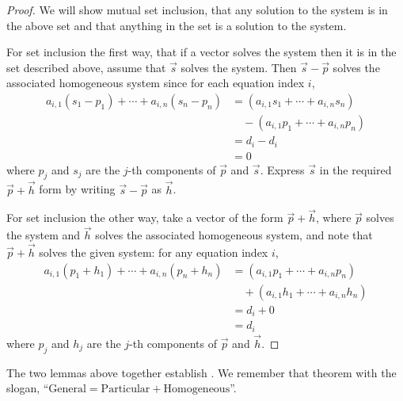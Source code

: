 \begin{proof}
We will show mutual set inclusion, that any solution to the system is in
the above set and that anything in the set is a solution to the 
system.

For set inclusion the first way, that if a vector solves the system
then it is in the set described above, 
assume that \( \vec{s} \) solves the system.
Then \( \vec{s}-\vec{p} \) solves the associated
homogeneous system since for each equation index \( i \),
\begin{equation*}
  \begin{split}
  a_{i,1}(s_1-p_1)+\cdots+a_{i,n}(s_n-p_n)
  &=(a_{i,1}s_1+\cdots+a_{i,n}s_n)       \\
  &\quad -(a_{i,1}p_1+\cdots+a_{i,n}p_n)  \\
  &=d_i-d_i                 \\
  &=0
  \end{split}
\end{equation*}
where \( p_j \) and \( s_j \) are the \( j \)-th components of
\( \vec{p} \) and \( \vec{s} \).
Express \( \vec{s} \) in the required \( \vec{p}+\vec{h} \) form
by writing \( \vec{s}-\vec{p} \) as \( \vec{h} \).

For set inclusion the other way, take a vector of the form $\vec{p}+\vec{h}$,
where \( \vec{p} \) solves the system and \( \vec{h} \) solves the
associated homogeneous system, and note that $\vec{p}+\vec{h}$ 
solves the given system: for any equation index $i$, 
\begin{equation*}
  \begin{split}
  a_{i,1}(p_1+h_1)+\cdots+a_{i,n}(p_n+h_n)
  &=(a_{i,1}p_1+\cdots+a_{i,n}p_n)      \\
  &\quad+(a_{i,1}h_1+\cdots+a_{i,n}h_n)  \\
  &=d_i+0                                \\
  &=d_i
  \end{split}
\end{equation*}
where \( p_j \) and \( h_j \) are the \( j \)-th components of 
\( \vec{p} \) and \( \vec{h} \).
\end{proof}

The two lemmas above together establish .
We remember that theorem with the slogan, 
``\( \text{General} = \text{Particular} + \text{Homogeneous} \)''.

